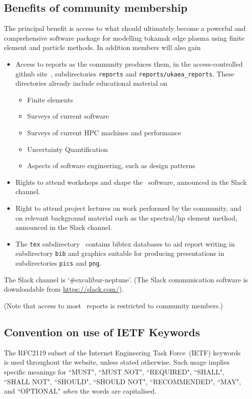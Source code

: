 \subsection{Benefits of community membership}
The principal benefit is access to what should ultimately become a powerful 
and comprehensive software package for modelling tokamak edge plasma using
finite element and particle methods.
In addition members will also gain
\begin{itemize}
\item Access to reports as the community produces them, in the access-controlled github site~\cite{xpndocswebsite},
subdirectories {\tt reports} and {\tt reports/ukaea\_reports}.
These directories already include educational material on
\begin{itemize}
\item Finite elements
\item Surveys of current software
\item Surveys of current HPC machines and performance
\item Uncertainty Quantification
\item Aspects of software engineering, such as design patterns
\end{itemize}
\item Rights to attend workshops and shape the \nep\ software, announced in the Slack channel.
\item Right to attend project lectures on work performed by the community, and on
relevant background material such as the spectral/hp element method, announced in the Slack channel.
\item The {\tt tex} subdirectory~\cite{xpntexwebsite} contains bibtex databases to aid report writing in subdirectory {\tt bib} and graphics suitable for producing presentations
in subdirectories {\tt pics} and {\tt png}.
\end{itemize}
The Slack channel is `\#excalibur-neptune'. (The Slack communication
software is downloadable from \url{https://slack.com/}).

(Note that access to most \nep \ reports is restricted to community members.)

\subsection{Convention on use of IETF Keywords}
The RFC2119 subset of the Internet Engineering Task Force~(IETF) keywords~\cite{rfc2119}
is used throughout the website, unless stated otherwise. Such usage implies specific
meanings for ``MUST", ``MUST NOT", ``REQUIRED", ``SHALL", ``SHALL
NOT", ``SHOULD", ``SHOULD NOT", ``RECOMMENDED",  ``MAY", and ``OPTIONAL"
\emph{when} the words are capitalised.

%
